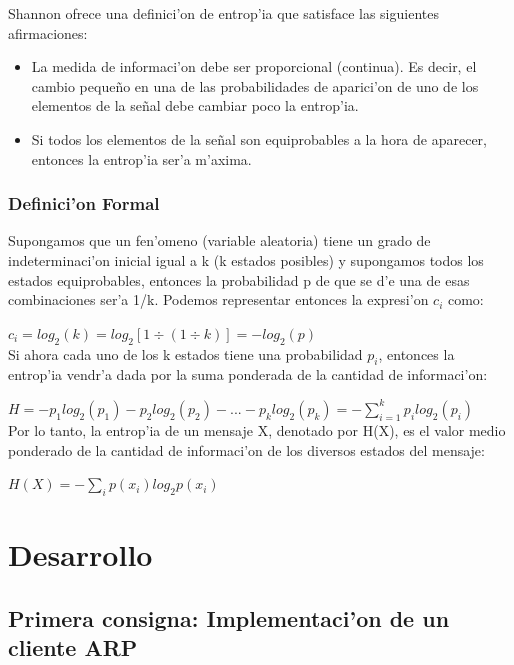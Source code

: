 \documentclass[a4paper,10pt]{article}
\begin{document}
\vspace*{5 mm}
Shannon ofrece una definici'on de entrop'ia que satisface las siguientes afirmaciones:

\begin{itemize}
	\item La medida de informaci'on debe ser proporcional (continua). Es decir, el cambio peque\~no en una de las probabilidades de aparici'on de uno de los elementos de la se\~nal debe cambiar poco la entrop'ia.
	\item Si todos los elementos de la se\~nal son equiprobables a la hora de aparecer, entonces la entrop'ia ser'a m'axima.	
\end{itemize}

\subsubsection{Definici'on Formal}

Supongamos que un fen'omeno (variable aleatoria) tiene un grado de indeterminaci'on inicial igual a k (k estados posibles) y supongamos todos los estados equiprobables, entonces la probabilidad p de que se d'e una de esas combinaciones ser'a 1/k. Podemos representar entonces la expresi'on  $c_{i}$ como:

\vspace*{5 mm}
$c_{i} = log_{2}(k) = log_{2}\left[ 1 \div (1 \div k)\right] = -log_{2}(p)$
\\

Si ahora cada uno de los k estados tiene una probabilidad $p_{i}$, entonces la entrop'ia vendr'a dada por la suma ponderada de la cantidad de informaci'on:

\vspace*{5 mm}
$H = -p_{1}log_{2}(p_{1}) - p_{2}log_{2}(p_{2}) - ... -p_{k}log_{2}(p_{k}) = -\sum^{k}_{i=1} p_{i}log_{2}(p_{i})$
\\

Por lo tanto, la entrop'ia de un mensaje X, denotado por H(X), es el valor medio ponderado de la cantidad de informaci'on de los diversos estados del mensaje:

\vspace*{5 mm}
$H(X) = -\sum_{i} p(x_{i})log_{2}p(x_{i})$
\\

\section{Desarrollo}
\label{desarrollo1:}
\subsection{Primera consigna: Implementaci'on de un cliente ARP}
\label{expli1:}
\end{document}
